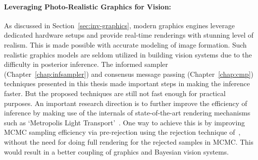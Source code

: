 \vspace{-0.2cm}
\paragraph{Leveraging Photo-Realistic Graphics for Vision:} As discussed in
Section~\ref{sec:inv-graphics}, modern graphics engines leverage dedicated hardware
setups and provide real-time renderings with stunning level of realism.
This is made possible with accurate modeling of image
formation. Such realistic graphics models are seldom utilized in building vision
systems due to the difficulty in posterior inference. The informed sampler
(Chapter~\ref{chap:infsampler}) and consensus message passing (Chapter~\ref{chap:cmp})
techniques presented in this thesis made important steps in making the inference
faster. But the proposed techniques are still not fast enough
for practical purposes. An important research direction is to further improve the
efficiency of inference by making use of the internals of state­-of­-the-­art rendering
mechanisms such as ‘Metropolis Light Transport’~\cite{vorba2014line}.
One way to achieve this is by improving MCMC sampling efficiency
via pre­-rejection using the rejection technique of~\cite{korattikara2013austerity},
without the need for doing full rendering for the rejected samples in MCMC.
This would result in a better coupling of graphics and Bayesian vision systems.

\vspace{-0.2cm}
